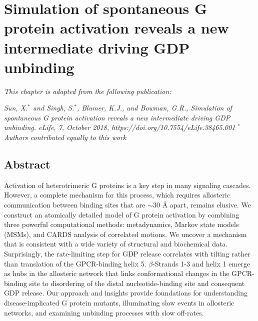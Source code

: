 \documentclass[../main.tex]{subfiles}
\begin{document}
    \chapter{Simulation of spontaneous G protein activation reveals a new intermediate driving GDP unbinding}
    \label{ch:GDPrelease}
    \graphicspath{{Chapter4/}}
    \captionsetup{labelfont=bf}

\textit{This chapter is adapted from the following publication:}

\textit{Sun, X.$^*$ and Singh, S.$^*$, Blumer, K.J., and Bowman, G.R., Simulation of spontaneous G protein activation reveals a new intermediate driving GDP unbinding. eLife, 7, October 2018, https://doi.org/10.7554/eLife.38465.001} \cite{Sun:2018kx}
\textit{$^*$Authors contributed equally to this work}

    \section{Abstract}
        Activation of heterotrimeric G proteins is a key step in many signaling cascades. However, a complete mechanism for this process, which requires allosteric communication between binding sites that are $\sim$30 \AA{} apart, remains elusive. We construct an atomically detailed model of G protein activation by combining three powerful computational methods: metadynamics, Markov state models (MSMs), and CARDS analysis of correlated motions. We uncover a mechanism that is consistent with a wide variety of structural and biochemical data. Surprisingly, the rate-limiting step for GDP release correlates with tilting rather than translation of the GPCR-binding helix 5. $\beta$-Strands 1-3 and helix 1 emerge as hubs in the allosteric network that links conformational changes in the GPCR-binding site to disordering of the distal nucleotide-binding site and consequent GDP release. Our approach and insights provide foundations for understanding disease-implicated G protein mutants, illuminating slow events in allosteric networks, and examining unbinding processes with slow off-rates.
			
\end{document}
